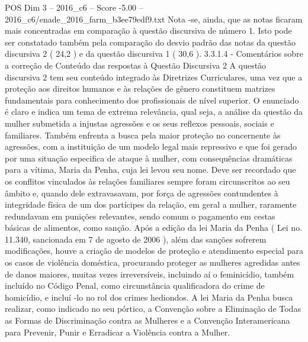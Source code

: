 \begin{textsample}{POS Dim 3 – 2016\_c6 – Score -5.00 – 2016\_c6/enade\_2016\_farm\_b3ee79edf9.txt}
Nota -se, ainda, que as notas ficaram mais concentradas em comparação à questão discursiva de número 1.
Isto pode ser constatado também pela comparação do desvio padrão das notas da questão discursiva 2 ( 24,2 ) e da questão discursiva 1 ( 30,6 ). 3.3.1.4 - Comentários sobre a correção de Conteúdo das respostas à Questão Discursiva 2 A questão discursiva 2 tem seu conteúdo integrado às Diretrizes Curriculares, uma vez que a proteção aos direitos humanos e às relações de gênero constituem matrizes fundamentais para conhecimento dos profissionais de nível superior.
O enunciado é claro e indica um tema de extrema relevância, qual seja, a análise da questão da mulher submetida a injustas agressões e os seus reflexos pessoais, sociais e familiares.
Também enfrenta a busca pela maior proteção no concernente às agressões, com a instituição de um modelo legal mais repressivo e que foi gerado por uma situação especifica de ataque à mulher, com consequências dramáticas para a vítima, Maria da Penha, cuja lei levou seu nome.
Deve ser recordado que os conflitos vinculados às relações familiares sempre foram circunscritos ao seu âmbito e, quando dele extravasavam, por força de agressões contundentes à integridade física de um dos partícipes da relação, em geral a mulher, raramente redundavam em punições relevantes, sendo comum o pagamento em cestas básicas de alimentos, como sanção.
Após a edição da lei Maria da Penha ( Lei no. 11.340, sancionada em 7 de agosto de 2006 ), além das sanções sofrerem modificações, houve a criação de modelos de proteção e atendimento especial para os casos de violência doméstica, procurando proteger as mulheres agredidas antes de danos maiores, muitas vezes irreversíveis, incluindo aí o feminicídio, também incluído no Código Penal, como circunstância qualificadora do crime de homicídio, e incluí -lo no rol dos crimes hediondos.
A lei Maria da Penha busca realizar, como indicado no seu pórtico, a Convenção sobre a Eliminação de Todas as Formas de Discriminação contra as Mulheres e a Convenção Interamericana para Prevenir, Punir e Erradicar a Violência contra a Mulher.

\end{textsample}
